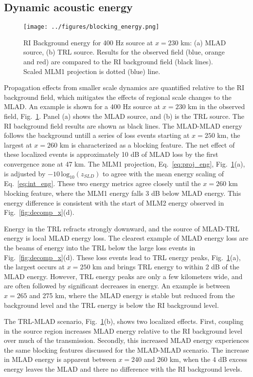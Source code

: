 \documentclass[preprint,NumberedRefs]{JASA}
\begin{document}
\subsection{Dynamic acoustic energy}\label{ssec:blocking}
\begin{figure}
\texttt{[image: ../figures/blocking\_energy.png]}
    \caption{RI Background energy for 400 Hz source at $x=230$ km: (a) MLAD source, (b) TRL source. Results for the observed field (blue, orange and red) are compared to the RI background field (black lines). Scaled MLM1 projection is dotted (blue) line.}
    \label{fig:ml_energy}
\end{figure}

Propagation effects from smaller scale dynamics are quantified relative to the RI background field, which mitigates the effects of regional scale changes to the MLAD. An example is shown for a 400 Hz source at $x=230$ km in the observed field, Fig.~\ref{fig:ml_energy}. Panel (a) shows the MLAD source, and (b) is the TRL source. The RI background field results are shown as black lines. The MLAD-MLAD energy follows the background untill a series of loss events starting at $x=250$ km, the largest at $x=260$ km is characterized as a blocking feature. The net effect of these localized events is approximately 10 dB of MLAD loss by the first convergence zone at 47 km. The MLM1 projection, Eq.~\eqref{eq:proj_eng}, Fig.~\ref{fig:ml_energy}(a), is adjusted by $-10 \, \textrm{log}_{10}(z_{SLD})$ to agree with the mean energy scaling of Eq.~\eqref{eq:int_eng}. These two energy metrics agree closely until the $x=260$ km blocking feature, where the MLM1 energy falls 3 dB below MLAD energy. This energy difference is consistent with the start of MLM2 energy observed in Fig.~\ref{fig:decomp_x}(d).

Energy in the TRL refracts strongly downward, and the source of MLAD-TRL energy is local MLAD energy loss. The clearest example of MLAD energy loss are the beams of energy into the TRL below the large loss events in Fig.~\ref{fig:decomp_x}(d). These loss events lead to TRL energy peaks, Fig.~\ref{fig:ml_energy}(a), the largest occurs at $x=250$ km and brings TRL energy to within 2 dB of the MLAD energy. However, TRL energy peaks are only a few kilometers wide, and are often followed by significant decreases in energy. An example is between $x=265$ and 275 km, where the MLAD energy is stable but reduced from the background level and the TRL energy is below the RI background level.

The TRL-MLAD scenario, Fig.~\ref{fig:ml_energy}(b), shows two localized effects. First, coupling in the source region increases MLAD energy relative to the RI background level over much of the transmission. Secondly, this increased MLAD energy experiences the same blocking features discussed for the MLAD-MLAD scenario. The increase in MLAD energy is apparent between $x=$240 and 260 km, when the 4 dB excess energy leaves the MLAD and there no difference with the RI background levels.
\end{document}

